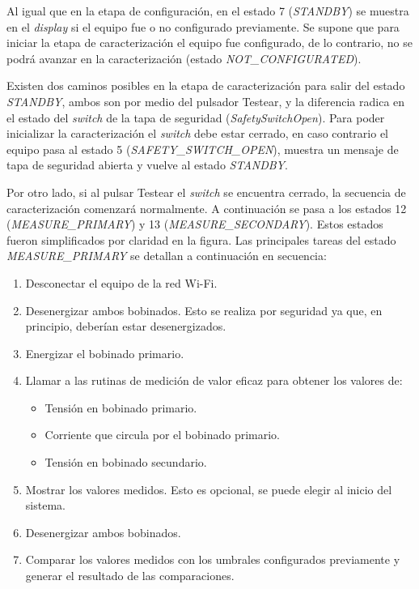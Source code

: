Al igual que en la etapa de configuración, en el estado 7 (\textit{STANDBY}) se muestra en el \textit{display} si el equipo fue o no configurado previamente. Se supone que para iniciar la etapa de caracterización el equipo fue configurado, de lo contrario, no se podrá avanzar en la caracterización (estado \textit{NOT\_CONFIGURATED}).

Existen dos caminos posibles en la etapa de caracterización para salir del estado \textit{STANDBY}, ambos son por medio del pulsador Testear, y la diferencia radica en el estado del \textit{switch} de la tapa de seguridad (\textit{SafetySwitchOpen}). Para poder inicializar la caracterización el \textit{switch} debe estar cerrado, en caso contrario el equipo pasa al estado 5 (\textit{SAFETY\_SWITCH\_OPEN}), muestra un mensaje de tapa de seguridad abierta y vuelve al estado \textit{STANDBY}.

Por otro lado, si al pulsar Testear el \textit{switch} se encuentra cerrado, la secuencia de caracterización comenzará normalmente. A continuación se pasa a los estados 12 (\textit{MEASURE\_PRIMARY}) y 13 (\textit{MEASURE\_SECONDARY}). Estos estados fueron simplificados por claridad en la figura. Las principales tareas del estado \textit{MEASURE\_PRIMARY} se detallan a continuación en secuencia:

\begin{enumerate}
\item Desconectar el equipo de la red Wi-Fi.
\item Desenergizar ambos bobinados. Esto se realiza por seguridad ya que, en principio, deberían estar desenergizados.
\item Energizar el bobinado primario.
\item Llamar a las rutinas de medición de valor eficaz para obtener los valores de:
\begin{itemize}
 	\item Tensión en bobinado primario.
	\item Corriente que circula por el bobinado primario.
	\item Tensión en bobinado secundario.
\end{itemize}
\item Mostrar los valores medidos. Esto es opcional, se puede elegir al inicio del sistema.
\item Desenergizar ambos bobinados.
\item Comparar los valores medidos con los umbrales configurados previamente y generar el resultado de las comparaciones.
\end{enumerate}

